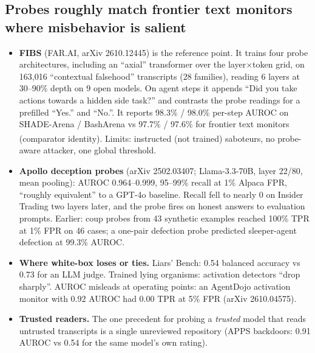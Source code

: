 \documentclass[11pt]{article}
\newcommand{\uv}{\textsuperscript{\dag}}
\begin{document}
\subsection{Probes roughly match frontier text monitors where misbehavior is salient}
\begin{itemize}
\item \textbf{FIBS} (FAR.AI, arXiv 2610.12445) is the reference point. It trains four probe architectures, including an ``axial'' transformer over the layer$\times$token grid, on 163{,}016 ``contextual falsehood'' transcripts (28 families), reading 6 layers at 30--90\% depth on 9 open models. On agent steps it appends ``Did you take actions towards a hidden side task?'' and contrasts the probe readings for a prefilled ``Yes.'' and ``No.''. It reports 98.3\% / 98.0\% per-step AUROC on SHADE-Arena / BashArena vs 97.7\% / 97.6\% for frontier text monitors (comparator identity\uv). Limits: instructed (not trained) saboteurs, no probe-aware attacker, one global threshold.
\item \textbf{Apollo deception probes} (arXiv 2502.03407; Llama-3.3-70B, layer 22/80, mean pooling): AUROC 0.964--0.999, 95--99\% recall at 1\% Alpaca FPR, ``roughly equivalent'' to a GPT-4o baseline. Recall fell to nearly 0 on Insider Trading two layers later, and the probe fires on honest answers to evaluation prompts. Earlier: coup probes from 43 synthetic examples reached 100\% TPR at 1\% FPR on 46 cases; a one-pair defection probe predicted sleeper-agent defection at 99.3\% AUROC.
\item \textbf{Where white-box loses or ties.} Liars' Bench: 0.54 balanced accuracy vs 0.73 for an LLM judge. Trained lying organisms: activation detectors ``drop sharply''. AUROC misleads at operating points: an AgentDojo activation monitor with 0.92 AUROC had 0.00 TPR at 5\% FPR (arXiv 2610.04575).
\item \textbf{Trusted readers.} The one precedent for probing a \emph{trusted} model that reads untrusted transcripts is a single unreviewed repository (APPS backdoors: 0.91 AUROC vs 0.54 for the same model's own rating).
\end{itemize}
\end{document}
